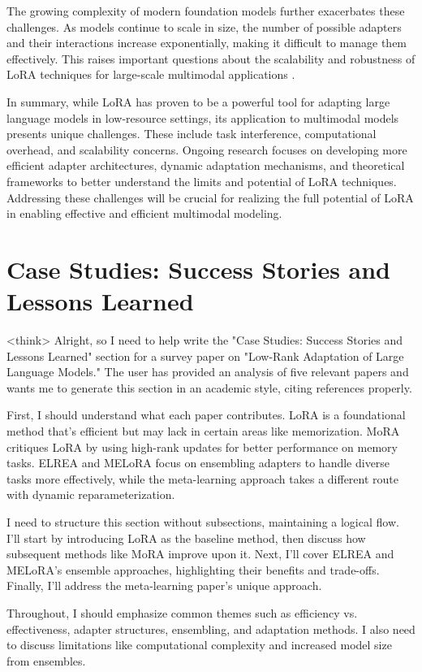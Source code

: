 \documentclass[conference]{IEEEtran}
\begin{document}
The growing complexity of modern foundation models further exacerbates these challenges. As models continue to scale in size, the number of possible adapters and their interactions increase exponentially, making it difficult to manage them effectively. This raises important questions about the scalability and robustness of LoRA techniques for large-scale multimodal applications \cite{bX}.

In summary, while LoRA has proven to be a powerful tool for adapting large language models in low-resource settings, its application to multimodal models presents unique challenges. These include task interference, computational overhead, and scalability concerns. Ongoing research focuses on developing more efficient adapter architectures, dynamic adaptation mechanisms, and theoretical frameworks to better understand the limits and potential of LoRA techniques. Addressing these challenges will be crucial for realizing the full potential of LoRA in enabling effective and efficient multimodal modeling.

\section{Case Studies: Success Stories and Lessons Learned}
<think>
Alright, so I need to help write the "Case Studies: Success Stories and Lessons Learned" section for a survey paper on "Low-Rank Adaptation of Large Language Models." The user has provided an analysis of five relevant papers and wants me to generate this section in an academic style, citing references properly. 

First, I should understand what each paper contributes. LoRA is a foundational method that's efficient but may lack in certain areas like memorization. MoRA critiques LoRA by using high-rank updates for better performance on memory tasks. ELREA and MELoRA focus on ensembling adapters to handle diverse tasks more effectively, while the meta-learning approach takes a different route with dynamic reparameterization.

I need to structure this section without subsections, maintaining a logical flow. I'll start by introducing LoRA as the baseline method, then discuss how subsequent methods like MoRA improve upon it. Next, I'll cover ELREA and MELoRA's ensemble approaches, highlighting their benefits and trade-offs. Finally, I'll address the meta-learning paper's unique approach.

Throughout, I should emphasize common themes such as efficiency vs. effectiveness, adapter structures, ensembling, and adaptation methods. I also need to discuss limitations like computational complexity and increased model size from ensembles.
\end{document}
